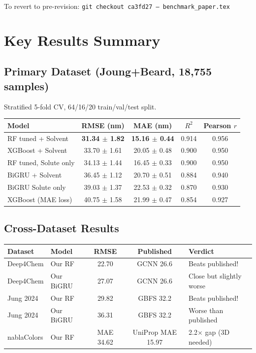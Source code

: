 \documentclass[11pt,a4paper]{article}
\begin{document}
\medskip
To revert to pre-revision: \texttt{git checkout ca3fd27 -- benchmark\_paper.tex}


\section{Key Results Summary}

\subsection{Primary Dataset (Joung+Beard, 18,755 samples)}

Stratified 5-fold CV, 64/16/20 train/val/test split.

\begin{tabular}{lcccc}
\toprule
\textbf{Model} & \textbf{RMSE (nm)} & \textbf{MAE (nm)} & $R^2$ & Pearson $r$ \\
\midrule
RF tuned + Solvent       & \textbf{31.34 $\pm$ 1.82} & \textbf{15.16 $\pm$ 0.44} & 0.914 & 0.956 \\
XGBoost + Solvent        & 33.70 $\pm$ 1.61 & 20.05 $\pm$ 0.48 & 0.900 & 0.950 \\
RF tuned, Solute only    & 34.13 $\pm$ 1.44 & 16.45 $\pm$ 0.33 & 0.900 & 0.950 \\
BiGRU + Solvent          & 36.45 $\pm$ 1.12 & 20.70 $\pm$ 0.51 & 0.884 & 0.940 \\
BiGRU Solute only        & 39.03 $\pm$ 1.37 & 22.53 $\pm$ 0.32 & 0.870 & 0.930 \\
XGBoost (MAE loss)       & 40.75 $\pm$ 1.58 & 21.99 $\pm$ 0.47 & 0.854 & 0.927 \\
\bottomrule
\end{tabular}

\subsection{Cross-Dataset Results}

\begin{tabular}{llccl}
\toprule
\textbf{Dataset} & \textbf{Model} & \textbf{RMSE} & \textbf{Published} & \textbf{Verdict} \\
\midrule
Deep4Chem  & Our RF   & 22.70 & GCNN 26.6  & \textcolor{done}{Beats published!} \\
Deep4Chem  & Our BiGRU & 27.07 & GCNN 26.6  & Close but slightly worse \\
Jung 2024  & Our RF   & 29.82 & GBFS 32.2  & \textcolor{done}{Beats published!} \\
Jung 2024  & Our BiGRU & 36.31 & GBFS 32.2  & Worse than published \\
nablaColors & Our RF  & MAE 34.62 & UniProp MAE 15.97 & 2.2$\times$ gap (3D needed) \\
\bottomrule
\end{tabular}
\end{document}
